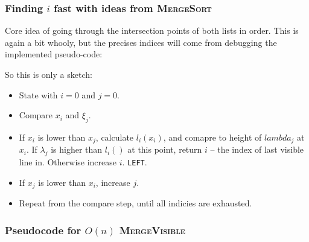 \documentclass[ignorenonframetext,]{beamer}
\begin{document}
\begin{frame}
  \frametitle{Finding $i$ fast with ideas from \textsc{MergeSort}}
  
  Core idea of going through the intersection points of both lists in
  order. This is again a bit whooly, but the precises indices will
  come from debugging the implemented pseudo-code:

  So this is only a sketch:
  \begin{itemize}
  \item State with $i = 0$ and $j=0$.
  \item Compare $x_i$ and $\xi_j$. 
  \item If $x_i$ is lower than $x_j$, calculate $l_i(x_i)$, and comapre to height
    of $lambda_{j}$ at $x_i$. If $\lambda_{j}$ is higher than $l_i()$
    at this point, return $i$ -- the index of last visible line
    in. Otherwise increase $i$.
    \texttt{LEFT}.
  \item If $x_j$ is lower than $x_i$, increase $j$.
  \item Repeat from the compare step, until all indicies are exhausted.
  \end{itemize}
\end{frame}

\begin{frame}
  \frametitle{Pseudocode for $O(n)$ \textsc{MergeVisible}}
  \begin{algorithmic}
    \EndProcedure
  \end{algorithmic}
\end{frame}
\end{document}
